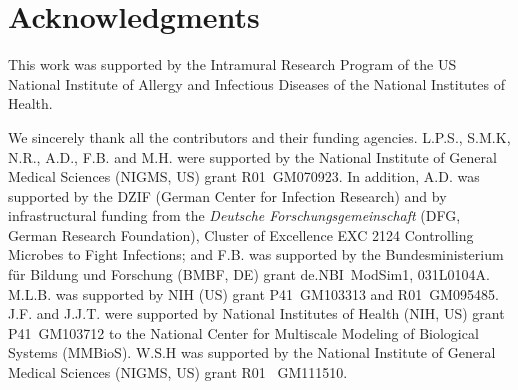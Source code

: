 
\section{Acknowledgments}


This work was supported by the Intramural Research Program of the US National Institute of Allergy and Infectious Diseases of the National Institutes of Health.

We sincerely thank all the contributors and their funding agencies. L.P.S., S.M.K, N.R., A.D., F.B. and M.H. were supported by the National Institute of General Medical Sciences (NIGMS, US) grant R01~GM070923. In addition, A.D. was supported by the DZIF (German Center for Infection Research) and by infrastructural funding from the \emph{Deutsche Forschungsgemeinschaft} (DFG, German Research Foundation), Cluster of Excellence EXC 2124 Controlling Microbes to Fight Infections; and F.B. was supported by the Bundesministerium f\"{u}r Bildung und Forschung (BMBF, DE) grant de.NBI~ModSim1, 031L0104A.
M.L.B. was supported by NIH (US) grant P41~GM103313 and R01~GM095485.
J.F. and J.J.T. were supported by National Institutes of Health (NIH, US) grant P41~GM103712 to the National Center for Multiscale Modeling of Biological Systems (MMBioS).
W.S.H was supported by the National Institute of General Medical Sciences (NIGMS, US) grant R01~ GM111510.


